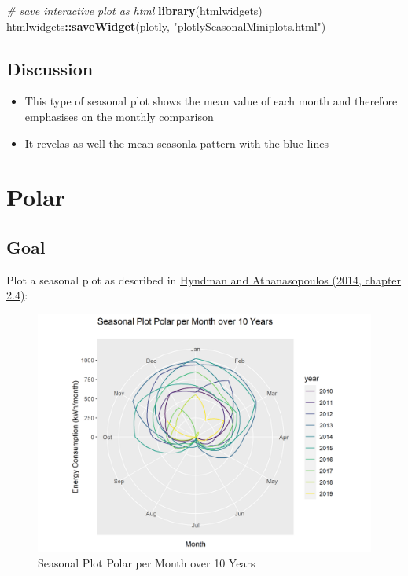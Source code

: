 \documentclass[
]{book}
\newenvironment{Shaded}{\begin{snugshade}}{\end{snugshade}}
\newcommand{\CommentTok}[1]{\textcolor[rgb]{0.56,0.35,0.01}{\textit{#1}}}
\newcommand{\KeywordTok}[1]{\textcolor[rgb]{0.13,0.29,0.53}{\textbf{#1}}}
\newcommand{\NormalTok}[1]{#1}
\newcommand{\OperatorTok}[1]{\textcolor[rgb]{0.81,0.36,0.00}{\textbf{#1}}}
\newcommand{\StringTok}[1]{\textcolor[rgb]{0.31,0.60,0.02}{#1}}
\let\oldShaded\Shaded
\let\endoldShaded\endShaded
\renewenvironment{Shaded}{\footnotesize\oldShaded}{\endoldShaded}
\begin{document}
\begin{Shaded}
\begin{Highlighting}[]
\CommentTok{# save interactive plot as html}
\KeywordTok{library}\NormalTok{(htmlwidgets)}
\NormalTok{htmlwidgets}\OperatorTok{::}\KeywordTok{saveWidget}\NormalTok{(plotly, }\StringTok{"plotlySeasonalMiniplots.html"}\NormalTok{)}
\end{Highlighting}
\end{Shaded}

\hypertarget{discussion-1}{%
\subsection{Discussion}\label{discussion-1}}

\begin{itemize}
\item
  This type of seasonal plot shows the mean value of each month and therefore emphasises on the monthly comparison
\item
  It revelas as well the mean seasonla pattern with the blue lines
\end{itemize}

\hypertarget{polar}{%
\section{Polar}\label{polar}}

\hypertarget{goal-2}{%
\subsection{Goal}\label{goal-2}}

Plot a seasonal plot as described in \href{https://otexts.com/fpp2/seasonal-plots.html}{Hyndman and Athanasopoulos (2014, chapter 2.4)}:

\begin{figure}
\includegraphics[width=0.7\linewidth]{images/plotSeasonalPolar} \caption{Seasonal Plot Polar per Month over 10 Years}\label{fig:unnamed-chunk-11}
\end{figure}
\end{document}
